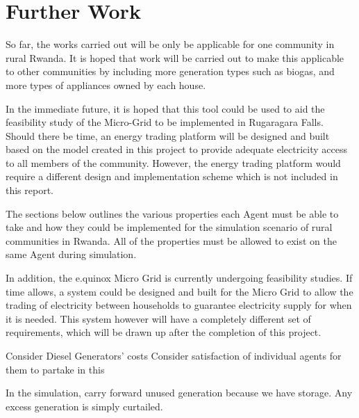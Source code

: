 \chapter{Further Work}
\label{Further Work}

So far, the works carried out will be only be applicable for one community in rural Rwanda. It is hoped that work will be carried out to make this applicable to other communities by including more generation types such as biogas, and more types of appliances owned by each house.

In the immediate future, it is hoped that this tool could be used to aid the feasibility study of the Micro-Grid to be implemented in Rugaragara Falls. Should there be time, an energy trading platform will be designed and built based on the model created in this project to provide adequate electricity access to all members of the community. However, the energy trading platform would require a different design and implementation scheme which is not included in this report.

The sections below outlines the various properties each Agent must be able to take and how they could be implemented for the simulation scenario of rural communities in Rwanda. All of the properties must be allowed to exist on the same Agent during simulation.

In addition, the e.quinox Micro Grid is currently undergoing feasibility studies. If time allows, a system could be designed and built for the Micro Grid to allow the trading of electricity between households to guarantee electricity supply for when it is needed. This system however will have a completely different set of requirements, which will be drawn up after the completion of this project.

Consider Diesel Generators' costs 
Consider satisfaction of individual agents for them to partake in this

In the simulation, carry forward unused generation because we have storage. Any excess generation is simply curtailed.